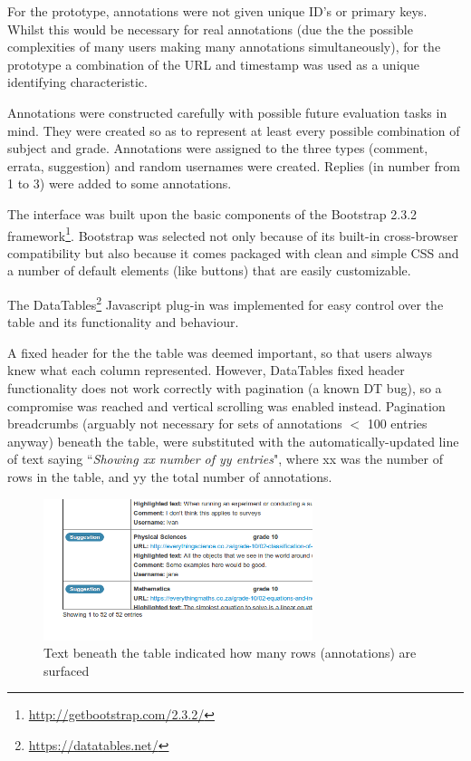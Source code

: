 For the prototype, annotations were not given unique ID's or primary keys. Whilst this would be necessary for real annotations (due the the possible complexities of many users making many annotations simultaneously), for the prototype a combination of the URL and timestamp was used as a unique identifying characteristic. 

Annotations were constructed carefully with possible future evaluation tasks in mind. They were created so as to represent at least every possible combination of subject and grade. Annotations were assigned to the three types (comment, errata, suggestion) and random usernames were created. Replies (in number from 1 to 3) were added to some annotations.

The interface was built upon the basic components of the Bootstrap 2.3.2 framework\footnote{\href{http://getbootstrap.com/2.3.2/}{http://getbootstrap.com/2.3.2/}}. Bootstrap was selected not only because of its built-in cross-browser compatibility but also because it comes packaged with clean and simple CSS and a number of default elements (like buttons) that are easily customizable. 

The DataTables\footnote{\href{https://datatables.net/}{https://datatables.net/}} Javascript plug-in was implemented for easy control over the table and its functionality and behaviour. 

A fixed header for the the table was deemed important, so that users always knew what each column represented. However, DataTables fixed header functionality does not work correctly with pagination (a known DT bug), so a compromise was reached and vertical scrolling was enabled instead. Pagination breadcrumbs (arguably not necessary for sets of annotations $<$ 100 entries anyway) beneath the table, were substituted with the automatically-updated line of text saying ``\textit{Showing xx number of yy entries}", where xx was the number of rows in the table, and yy the total number of annotations.

\begin{figure}[h!]
    \centering
    \includegraphics[width=0.7\textwidth]{Figures/V1/breadcrumbs.png}
 \caption{Text beneath the table indicated how many rows (annotations) are surfaced}
 \label{fig:breadcrumbs}
\end{figure}

